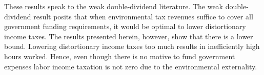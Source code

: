 These results speak to the weak double-dividend literature. %
The weak double-dividend result posits that when environmental tax revenues suffice to cover all government funding requirements, it would be optimal to lower distortionary income taxes. The results presented herein, however, show that there is a lower bound. Lowering distortionary income taxes too much results in inefficiently high hours worked. Hence, even though there is no motive to fund government expenses  labor income taxation is not zero due to the environmental externality.



